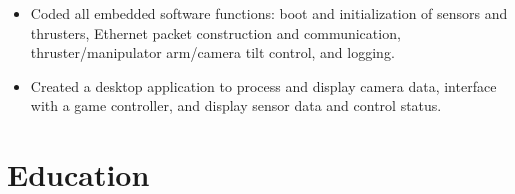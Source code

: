 \begin{tcolorbox}
\begin{minipage}[t]{0.825\textwidth}
\begin{tcolorbox}[grow to right by=0.95cm,height=0.8\textheight,colframe=white,colback=white]
{\begin{itemize}
                        \item Coded all embedded software functions: boot and initialization of sensors and thrusters, Ethernet packet construction and communication, thruster/manipulator arm/camera tilt control, and logging.

                        \item Created a desktop application to process and display camera data, interface with a game controller, and display sensor data and control status.
                        
                        
                        
                        
                    \end{itemize}}

                \section*{\Large{Education}}
                
                    
                    \vspace{1em}
                    
\end{tcolorbox}
\end{minipage}
\end{tcolorbox}
